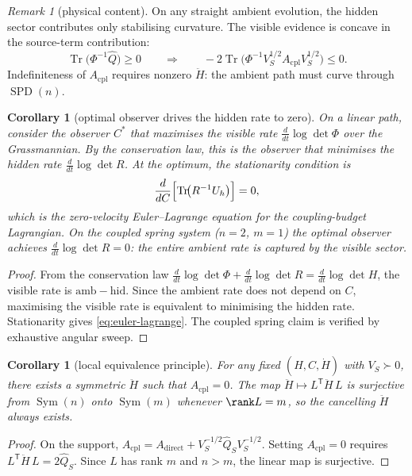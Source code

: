 \documentclass[11pt,a4paper]{article}
\numberwithin{equation}{section}
\DeclareMathOperator{\Tr}{Tr}
\DeclareMathOperator{\Sym}{Sym}
\theoremstyle{thmcompact}
\newtheorem{corollary}[theorem]{Corollary}
\theoremstyle{remark}
\newtheorem*{remarkplain}{Remark}
\newenvironment{remark}[1][]%
{\begin{remarkbox}\begin{remarkplain}[#1]\normalfont}
{\end{remarkplain}\end{remarkbox}}
\begin{document}
\begin{remark}[physical content]
On any straight ambient evolution, the hidden sector contributes only stabilising curvature. The visible evidence is concave in the source-term contribution:
\[
\Tr\!\bigl(\Phi^{-1}\widehat Q\bigr)\ge 0
\qquad\Longrightarrow\qquad
-2\Tr\!\bigl(\Phi^{-1}V_S^{1/2}A_{\mathrm{cpl}}V_S^{1/2}\bigr)\le 0.
\]
Indefiniteness of $A_{\mathrm{cpl}}$ requires nonzero $\ddot H$: the ambient path must curve through $\operatorname{SPD}(n)$.
\end{remark}

\begin{corollary}[optimal observer drives the hidden rate to zero]\label{cor:optimal-observer}
On a linear path, consider the observer $C^*$ that maximises the visible rate $\frac{d}{dt}\log\det\Phi$ over the Grassmannian. By the conservation law, this is the observer that minimises the hidden rate $\frac{d}{dt}\log\det R$. At the optimum, the stationarity condition is
\begin{equation}
\frac{d}{dC}\Bigl[\Tr\!\bigl(R^{-1}U_h\bigr)\Bigr]=0,
\label{eq:euler-lagrange}
\end{equation}
which is the zero-velocity Euler--Lagrange equation for the coupling-budget Lagrangian. On the coupled spring system ($n=2$, $m=1$) the optimal observer achieves $\frac{d}{dt}\log\det R=0$: the entire ambient rate is captured by the visible sector.
\end{corollary}

\begin{proof}
From the conservation law $\frac{d}{dt}\log\det\Phi+\frac{d}{dt}\log\det R=\frac{d}{dt}\log\det H$, the visible rate is $\mathrm{amb}-\mathrm{hid}$. Since the ambient rate does not depend on $C$, maximising the visible rate is equivalent to minimising the hidden rate. Stationarity gives \eqref{eq:euler-lagrange}. The coupled spring claim is verified by exhaustive angular sweep.
\end{proof}

\begin{corollary}[local equivalence principle]\label{cor:equivalence}
For any fixed $(H,C,\dot H)$ with $V_S\succ 0$, there exists a symmetric $\ddot H$ such that $A_{\mathrm{cpl}}=0$. The map $\ddot H\mapsto L^{\mathsf T}\ddot H\,L$ is surjective from $\Sym(n)$ onto $\Sym(m)$ whenever $\rank L=m$, so the cancelling $\ddot H$ always exists.
\end{corollary}

\begin{proof}
On the support, $A_{\mathrm{cpl}}=A_{\mathrm{direct}}+V_S^{-1/2}\widehat Q_S V_S^{-1/2}$. Setting $A_{\mathrm{cpl}}=0$ requires $L^{\mathsf T}\ddot H\,L=2\widehat Q_S$. Since $L$ has rank $m$ and $n>m$, the linear map is surjective.
\end{proof}
\end{document}
